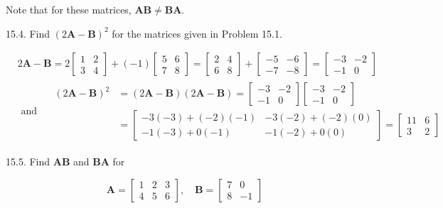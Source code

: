 \documentclass[10pt]{article}
\begin{document}
Note that for these matrices, $\mathbf{A B} \neq \mathbf{B A}$.

15.4. Find $(2 \mathbf{A}-\mathbf{B})^{2}$ for the matrices given in Problem 15.1.

$$
\begin{aligned}
& 2 \mathbf{A}-\mathbf{B}=2\left[\begin{array}{ll}
1 & 2 \\
3 & 4
\end{array}\right]+(-1)\left[\begin{array}{ll}
5 & 6 \\
7 & 8
\end{array}\right]=\left[\begin{array}{ll}
2 & 4 \\
6 & 8
\end{array}\right]+\left[\begin{array}{ll}
-5 & -6 \\
-7 & -8
\end{array}\right]=\left[\begin{array}{rr}
-3 & -2 \\
-1 & 0
\end{array}\right] \\
& \text { and } \quad \begin{aligned}
(2 \mathbf{A}-\mathbf{B})^{2} & =(2 \mathbf{A}-\mathbf{B})(2 \mathbf{A}-\mathbf{B})=\left[\begin{array}{ll}
-3 & -2 \\
-1 & 0
\end{array}\right]\left[\begin{array}{rr}
-3 & -2 \\
-1 & 0
\end{array}\right] \\
& =\left[\begin{array}{ll}
-3(-3)+(-2)(-1) & -3(-2)+(-2)(0) \\
-1(-3)+0(-1) & -1(-2)+0(0)
\end{array}\right]=\left[\begin{array}{rr}
11 & 6 \\
3 & 2
\end{array}\right]
\end{aligned}
\end{aligned}
$$

15.5. Find $\mathbf{A B}$ and $\mathbf{B A}$ for

$$
\mathbf{A}=\left[\begin{array}{lll}
1 & 2 & 3 \\
4 & 5 & 6
\end{array}\right], \quad \mathbf{B}=\left[\begin{array}{rr}
7 & 0 \\
8 & -1
\end{array}\right]
$$
\end{document}
